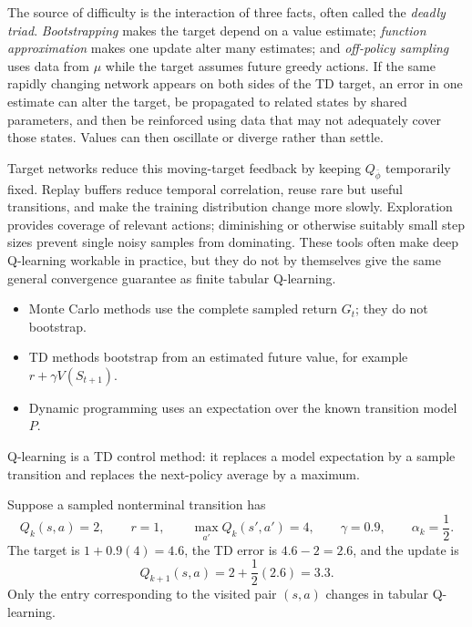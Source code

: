 \documentclass[11pt,a4paper]{article}
\theoremstyle{definition}
\begin{document}
\begin{note}
The source of difficulty is the interaction of three facts, often called the
\emph{deadly triad}. \emph{Bootstrapping} makes the target depend on a value estimate;
\emph{function approximation} makes one update alter many estimates; and
\emph{off-policy sampling} uses data from $\mu$ while the target assumes future greedy actions.
If the same rapidly changing network appears on both sides of the TD target, an error in one
estimate can alter the target, be propagated to related states by shared parameters, and then be
reinforced using data that may not adequately cover those states. Values can then oscillate or
diverge rather than settle.

Target networks reduce this moving-target feedback by keeping $Q_{\bar\phi}$ temporarily fixed.
Replay buffers reduce temporal correlation, reuse rare but useful transitions, and make the
training distribution change more slowly. Exploration provides coverage of relevant actions;
diminishing or otherwise suitably small step sizes prevent single noisy samples from dominating.
These tools often make deep Q-learning workable in practice, but they do not by themselves give
the same general convergence guarantee as finite tabular Q-learning.
\end{note}

\begin{note}
\begin{itemize}
    \item Monte Carlo methods use the complete sampled return $G_t$; they do not bootstrap.
    \item TD methods bootstrap from an estimated future value, for example
    $r+\gamma V(S_{t+1})$.
    \item Dynamic programming uses an expectation over the known transition model $P$.
\end{itemize}
Q-learning is a TD control method: it replaces a model expectation by a sample transition
and replaces the next-policy average by a maximum.
\end{note}

\begin{example}
Suppose a sampled nonterminal transition has
\[
Q_k(s,a)=2,
\qquad
r=1,
\qquad
\max_{a'}Q_k(s',a')=4,
\qquad
\gamma=0.9,
\qquad
\alpha_k=\frac12.
\]
The target is $1+0.9(4)=4.6$, the TD error is $4.6-2=2.6$, and the update is
\[
Q_{k+1}(s,a)
=2+\frac12(2.6)=3.3.
\]
Only the entry corresponding to the visited pair $(s,a)$ changes in tabular Q-learning.
\end{example}
\end{document}
